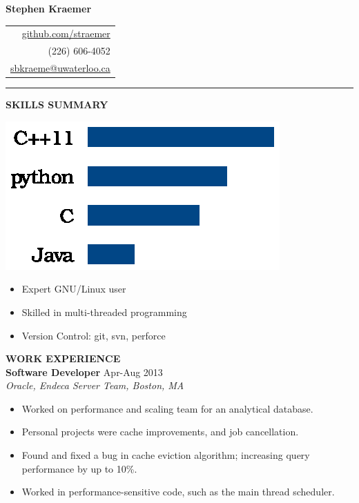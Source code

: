 \documentclass{letter}
\begin{document}
{\Huge\bf Stephen Kraemer} \hfill
\begin{tabular}{r}
  \href{https://github.com/straemer}{github.com/straemer} \\
  (226) 606-4052 \\
  \href{mailto:sbkraeme@uwaterloo.ca}{sbkraeme@uwaterloo.ca}
\end{tabular}

\vskip 2pt
\hrule

{\large\bf SKILLS SUMMARY} \\
\begin{minipage}{0.35\textwidth}
\includegraphics{programming_languages.eps}
\end{minipage}
\begin{minipage}{0.65\textwidth}
\begin{itemize}
\item Expert GNU/Linux user
\item Skilled in multi-threaded programming
\item Version Control: git, svn, perforce
\end{itemize}
\end{minipage}


{\large\bf WORK EXPERIENCE} \\
{\bf Software Developer} \hfill Apr-Aug 2013 \\
{\sl Oracle, Endeca Server Team, Boston, MA}
\begin{itemize}
\item Worked on performance and scaling team for an analytical database.
\item Personal projects were cache improvements, and job cancellation.
\item Found and fixed a bug in cache eviction algorithm; increasing query performance by up to 10\%.
\item Worked in performance-sensitive code, such as the main thread scheduler.
\end{itemize}
\end{document}
